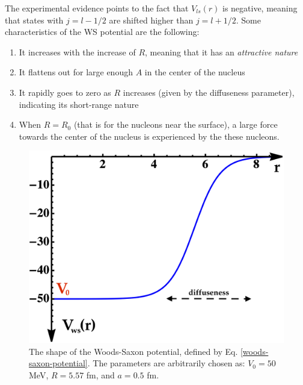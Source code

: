 The experimental evidence points to the fact that $V_{ls}(r)$ is negative, meaning that states with $j=l-1/2$ are shifted higher than $j=l+1/2$. Some characteristics of the WS potential are the following:
\begin{enumerate}
    \item It increases with the increase of $R$, meaning that it has an \emph{attractive nature}
    \item It flattens out for large enough $A$ in the center of the nucleus
    \item It rapidly goes to zero as $R$ increases (given by the diffuseness parameter), indicating its short-range nature
    \item When $R=R_0$ (that is for the nucleons near the surface), a large force towards the center of the nucleus is experienced by the these nucleons.
\end{enumerate}
\begin{figure}
    \centering
    \includegraphics[scale=0.2]{Chapters/Figures/ws_potential_plot.png}
    \caption{The shape of the Woods-Saxon potential, defined by Eq. \ref{woods-saxon-potential}. The parameters are arbitrarily chosen as: $V_0=50$ MeV, $R=5.57$ fm, and $a=0.5$ fm.}
    \label{woods-saxon-plot}
\end{figure}

